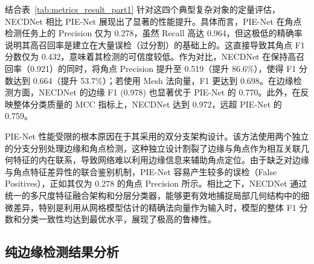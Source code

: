 结合表~\ref{tab:metrics_result_part1} 针对这四个典型复杂对象的定量评估，NECDNet 相比 PIE-Net 展现出了显著的性能提升。具体而言，PIE-Net 在角点检测任务上的 Precision 仅为 0.278，虽然 Recall 高达 0.964，但这极低的精确率说明其高召回率是建立在大量误检（过分割）的基础上的。这直接导致其角点 F1 分数仅为 0.432，意味着其检测的可信度较低。作为对比，NECDNet 在保持高召回率（0.921）的同时，将角点 Precision 提升至 0.519（提升 86.6\%），使得 F1 分数达到 0.664（提升 53.7\%）；若使用 Mesh 法向量，F1 更达到 0.698。在边缘检测方面，NECDNet 的边缘 F1 (0.978) 也显著优于 PIE-Net 的 0.770。此外，在反映整体分类质量的 MCC 指标上，NECDNet 达到 0.972，远超 PIE-Net 的 0.759。

PIE-Net 性能受限的根本原因在于其采用的双分支架构设计。该方法使用两个独立的分支分别处理边缘和角点检测，这种独立设计割裂了边缘与角点作为相互关联几何特征的内在联系，导致网络难以利用边缘信息来辅助角点定位。由于缺乏对边缘与角点特征差异性的联合鉴别机制，PIE-Net 容易产生较多的误检（False Positives），正如其仅为 0.278 的角点 Precision 所示。相比之下，NECDNet 通过统一的多尺度特征融合架构和分层分类器，能够更有效地捕捉局部几何结构中的细微差异，特别是利用从网格模型估计的精确法向量作为输入时，模型的整体 F1 分数和分类一致性均达到最优水平，展现了极高的鲁棒性。



\subsection{纯边缘检测结果分析}

